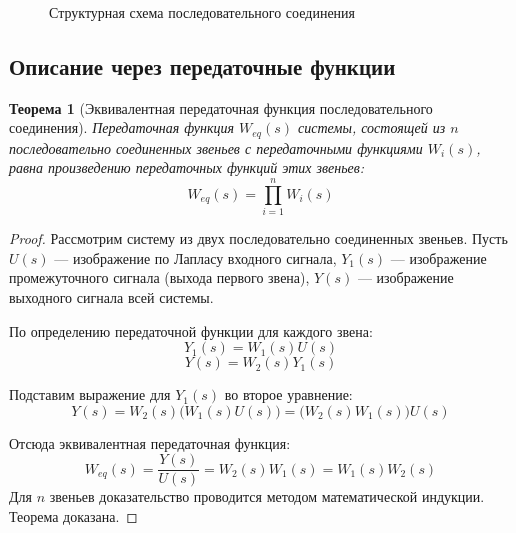 \documentclass[12pt,a4paper]{article}
\newtheorem{theorem}{Теорема}
\begin{document}
\begin{figure}[H]
    \centering
    \caption{Структурная схема последовательного соединения}
\end{figure}

\subsection{Описание через передаточные функции}

\begin{theorem}[Эквивалентная передаточная функция последовательного соединения]
    Передаточная функция $W_{eq}(s)$ системы, состоящей из $n$ последовательно соединенных звеньев с передаточными функциями $W_i(s)$, равна произведению передаточных функций этих звеньев:
    \begin{equation}
        W_{eq}(s) = \prod_{i=1}^{n} W_i(s)
    \end{equation}
\end{theorem}

\begin{proof}
    Рассмотрим систему из двух последовательно соединенных звеньев. Пусть $U(s)$ — изображение по Лапласу входного сигнала, $Y_1(s)$ — изображение промежуточного сигнала (выхода первого звена), $Y(s)$ — изображение выходного сигнала всей системы.

    По определению передаточной функции для каждого звена:
    \begin{equation}
        Y_1(s) = W_1(s)U(s)
    \end{equation}
    \begin{equation}
        Y(s) = W_2(s)Y_1(s)
    \end{equation}

    Подставим выражение для $Y_1(s)$ во второе уравнение:
    \begin{equation}
        Y(s) = W_2(s) \big(W_1(s)U(s)\big) = \big(W_2(s)W_1(s)\big) U(s)
    \end{equation}

    Отсюда эквивалентная передаточная функция:
    \begin{equation}
        W_{eq}(s) = \frac{Y(s)}{U(s)} = W_2(s)W_1(s) = W_1(s)W_2(s)
    \end{equation}
    Для $n$ звеньев доказательство проводится методом математической индукции. Теорема доказана.
\end{proof}
\end{document}
